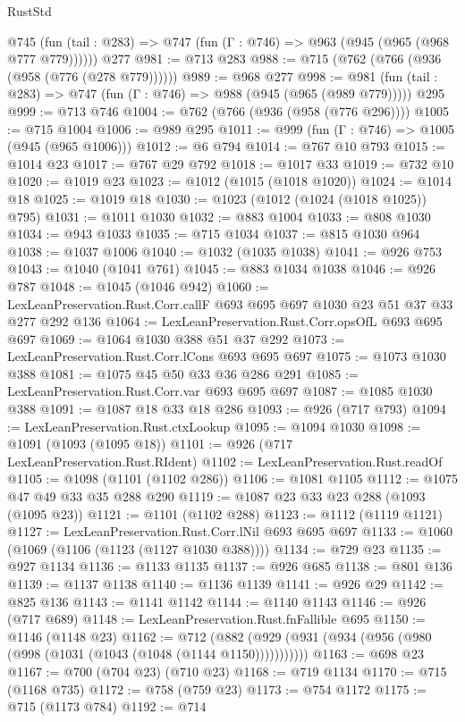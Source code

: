 \begin{lexlean}{RustStd}
\begin{coremodule}
    @745 (fun (tail : @283) => @747 (fun (Γ : @746) => @963 (@945 (@965 (@968 @777 @779))))))
    @277
@981 := @713 @283
@988 := @715 (@762 (@766 (@936 (@958 (@776 (@278 @779))))))
@989 := @968 @277
@998 := @981 (fun (tail : @283) => @747 (fun (Γ : @746) => @988 (@945 (@965 (@989 @779))))) @295
@999 := @713 @746
@1004 := @762 (@766 (@936 (@958 (@776 @296))))
@1005 := @715 @1004
@1006 := @989 @295
@1011 := @999 (fun (Γ : @746) => @1005 (@945 (@965 @1006)))
@1012 := @6 @794
@1014 := @767 @10 @793
@1015 := @1014 @23
@1017 := @767 @29 @792
@1018 := @1017 @33
@1019 := @732 @10
@1020 := @1019 @23
@1023 := @1012 (@1015 (@1018 @1020))
@1024 := @1014 @18
@1025 := @1019 @18
@1030 := @1023 (@1012 (@1024 (@1018 @1025)) @795)
@1031 := @1011 @1030
@1032 := @883 @1004
@1033 := @808 @1030
@1034 := @943 @1033
@1035 := @715 @1034
@1037 := @815 @1030 @964
@1038 := @1037 @1006
@1040 := @1032 (@1035 @1038)
@1041 := @926 @753
@1043 := @1040 (@1041 @761)
@1045 := @883 @1034 @1038
@1046 := @926 @787
@1048 := @1045 (@1046 @942)
@1060 := LexLeanPreservation.Rust.Corr.callF @693 @695 @697 @1030 @23 @51 @37 @33 @277 @292 @136
@1064 := LexLeanPreservation.Rust.Corr.opsOfL @693 @695 @697
@1069 := @1064 @1030 @388 @51 @37 @292
@1073 := LexLeanPreservation.Rust.Corr.lCons @693 @695 @697
@1075 := @1073 @1030 @388
@1081 := @1075 @45 @50 @33 @36 @286 @291
@1085 := LexLeanPreservation.Rust.Corr.var @693 @695 @697
@1087 := @1085 @1030 @388
@1091 := @1087 @18 @33 @18 @286
@1093 := @926 (@717 @793)
@1094 := LexLeanPreservation.Rust.ctxLookup
@1095 := @1094 @1030
@1098 := @1091 (@1093 (@1095 @18))
@1101 := @926 (@717 LexLeanPreservation.Rust.RIdent)
@1102 := LexLeanPreservation.Rust.readOf
@1105 := @1098 (@1101 (@1102 @286))
@1106 := @1081 @1105
@1112 := @1075 @47 @49 @33 @35 @288 @290
@1119 := @1087 @23 @33 @23 @288 (@1093 (@1095 @23))
@1121 := @1101 (@1102 @288)
@1123 := @1112 (@1119 @1121)
@1127 := LexLeanPreservation.Rust.Corr.lNil @693 @695 @697
@1133 := @1060 (@1069 (@1106 (@1123 (@1127 @1030 @388))))
@1134 := @729 @23
@1135 := @927 @1134
@1136 := @1133 @1135
@1137 := @926 @685
@1138 := @801 @136
@1139 := @1137 @1138
@1140 := @1136 @1139
@1141 := @926 @29
@1142 := @825 @136
@1143 := @1141 @1142
@1144 := @1140 @1143
@1146 := @926 (@717 @689)
@1148 := LexLeanPreservation.Rust.fnFallible @695
@1150 := @1146 (@1148 @23)
@1162 := @712 (@882 (@929 (@931 (@934 (@956 (@980 (@998 (@1031 (@1043 (@1048 (@1144 @1150)))))))))))
@1163 := @698 @23
@1167 := @700 (@704 @23) (@710 @23)
@1168 := @719 @1134
@1170 := @715 (@1168 @735)
@1172 := @758 (@759 @23)
@1173 := @754 @1172
@1175 := @715 (@1173 @784)
@1192 := @714

\end{coremodule}
\end{lexlean}
